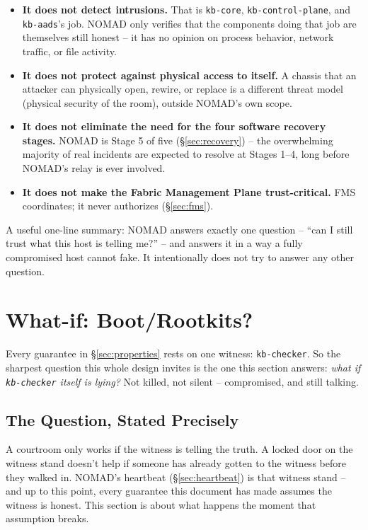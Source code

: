 \documentclass[11pt,a4paper]{article}
\begin{document}
\begin{itemize}
  \item \textbf{It does not detect intrusions.} That is
    \texttt{kb-core}, \texttt{kb-control-plane}, and \texttt{kb-aads}'s
    job. NOMAD only verifies that the components doing that job are
    themselves still honest -- it has no opinion on process behavior,
    network traffic, or file activity.
  \item \textbf{It does not protect against physical access to itself.}
    A chassis that an attacker can physically open, rewire, or replace
    is a different threat model (physical security of the room),
    outside NOMAD's own scope.
  \item \textbf{It does not eliminate the need for the four software
    recovery stages.} NOMAD is Stage 5 of five (\S\ref{sec:recovery}) --
    the overwhelming majority of real incidents are expected to resolve
    at Stages 1--4, long before NOMAD's relay is ever involved.
  \item \textbf{It does not make the Fabric Management Plane
    trust-critical.} FMS coordinates; it never authorizes
    (\S\ref{sec:fms}).
\end{itemize}

\begin{plainbox}
A useful one-line summary: NOMAD answers exactly one question --
``can I still trust what this host is telling me?'' -- and answers it
in a way a fully compromised host cannot fake. It intentionally does
not try to answer any other question.
\end{plainbox}

\section{What-if: Boot/Rootkits?}
\label{sec:whatif}

Every guarantee in \S\ref{sec:properties} rests on one witness:
\texttt{kb-checker}. So the sharpest question this whole design
invites is the one this section answers: \emph{what if
\texttt{kb-checker} itself is lying?} Not killed, not silent --
compromised, and still talking.

\subsection{The Question, Stated Precisely}

\begin{analogybox}
A courtroom only works if the witness is telling the truth. A locked
door on the witness stand doesn't help if someone has already gotten
to the witness before they walked in. NOMAD's heartbeat
(\S\ref{sec:heartbeat}) is that witness stand -- and up to this point,
every guarantee this document has made assumes the witness is honest.
This section is about what happens the moment that assumption breaks.
\end{analogybox}
\end{document}
